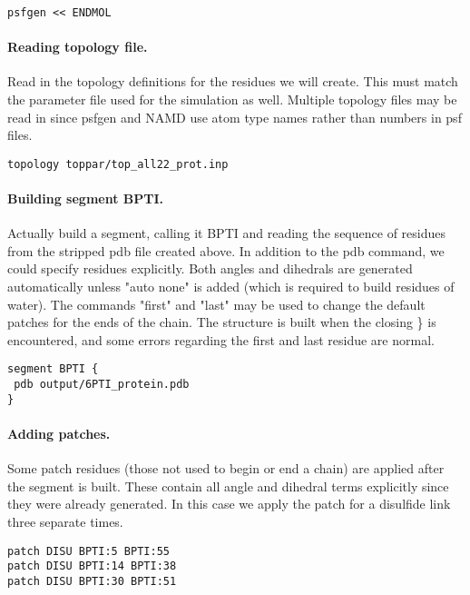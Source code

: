 \begin{verbatim}
psfgen << ENDMOL
\end{verbatim}

\paragraph*{Reading topology file.}

Read in the topology definitions for the residues we will create.
This must match the parameter file used for the simulation as well.
Multiple topology files may be read in since psfgen and NAMD use atom
type names rather than numbers in psf files.

\begin{verbatim}
topology toppar/top_all22_prot.inp
\end{verbatim}

\paragraph*{Building segment BPTI.}


Actually build a segment, calling it BPTI and reading the sequence
of residues from the stripped pdb file created above.  In addition to
the pdb command, we could specify residues explicitly.  Both angles
and dihedrals are generated automatically unless "auto none" is added
(which is required to build residues of water).  The commands "first"
and "last" may be used to change the default patches for the ends of
the chain.  The structure is built when the closing \} is encountered,
and some errors regarding the first and last residue are normal.

\begin{verbatim}
segment BPTI {
 pdb output/6PTI_protein.pdb
}
\end{verbatim}

\paragraph*{Adding patches.}


Some patch residues (those not used to begin or end a chain) are
applied after the segment is built.  These contain all angle and
dihedral terms explicitly since they were already generated.  In this
case we apply the patch for a disulfide link three separate times.

\begin{verbatim}
patch DISU BPTI:5 BPTI:55
patch DISU BPTI:14 BPTI:38
patch DISU BPTI:30 BPTI:51
\end{verbatim}

